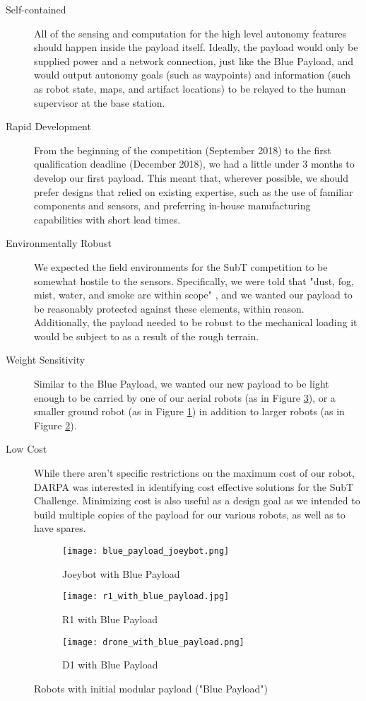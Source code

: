 \begin{description}
	\item[Self-contained] All of the sensing and computation for the high level autonomy features should happen inside the payload itself. Ideally, the payload would only be supplied power and a network connection, just like the Blue Payload, and would output autonomy goals (such as waypoints) and information (such as robot state, maps, and artifact locations) to be relayed to the human supervisor at the base station.
	\item[Rapid Development] From the beginning of the competition (September 2018) to the first qualification deadline (December 2018), we had a little under 3 months to develop our first payload. This meant that, wherever possible, we should prefer designs that relied on existing expertise, such as the use of familiar components and sensors, and preferring in-house manufacturing capabilities with short lead times.
	\item[Environmentally Robust] We expected the field environments for the SubT competition to be somewhat hostile to the sensors. Specifically, we were told that "dust, fog, mist, water, and smoke are within scope" \cite{tunnel_rules}, and we wanted our payload to be reasonably protected against these elements, within reason. Additionally, the payload needed to be robust to the mechanical loading it would be subject to as a result of the rough terrain.
	\item[Weight Sensitivity] Similar to the Blue Payload, we wanted our new payload to be light enough to be carried by one of our aerial robots (as in Figure \ref{d1 blue payload}), or a smaller ground robot (as in Figure \ref{joeybot blue payload}) in addition to larger robots (as in Figure \ref{r1 blue payload}).
	\item[Low Cost] While there aren't specific restrictions on the maximum cost of our robot, DARPA was interested in identifying cost effective solutions for the SubT Challenge. Minimizing cost is also useful as a design goal as we intended to build multiple copies of the payload for our various robots, as well as to have spares.
\end{description}

\begin{figure}
	\centering
	\begin{subfigure}{0.3\textwidth}
		\texttt{[image: blue\_payload\_joeybot.png]}
		\caption{Joeybot with Blue Payload}
		\label{joeybot blue payload}
	\end{subfigure}		
	\hfill
	\begin{subfigure}{0.3\textwidth}
		\texttt{[image: r1\_with\_blue\_payload.jpg]}
		\caption{R1 with Blue Payload}
		\label{r1 blue payload}		
	\end{subfigure}
	\hfill
	\begin{subfigure}{0.3\textwidth}
		\texttt{[image: drone\_with\_blue\_payload.png]}
		\caption{D1 with Blue Payload}
		\label{d1 blue payload}
	\end{subfigure}	
	\caption{Robots with initial modular payload ("Blue Payload")}
	\label{blue payload robots}
\end{figure}

